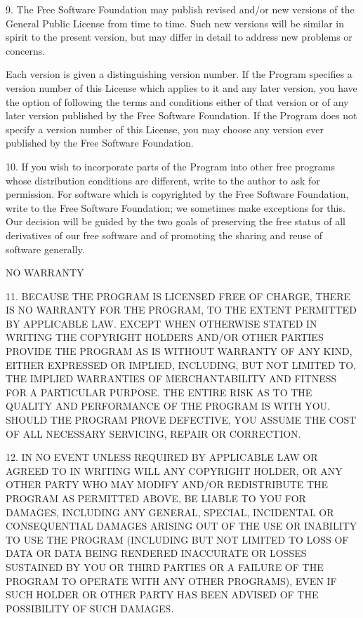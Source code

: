 \documentclass[letterpaper,10pt,english]{sphinxmanual}
\begin{document}
\begin{sphinxVerbatim}[commandchars=\\\{\}]
  9. The Free Software Foundation may publish revised and/or new versions
of the General Public License from time to time.  Such new versions will
be similar in spirit to the present version, but may differ in detail to
address new problems or concerns.

Each version is given a distinguishing version number.  If the Program
specifies a version number of this License which applies to it and \PYGZdq{}any
later version\PYGZdq{}, you have the option of following the terms and conditions
either of that version or of any later version published by the Free
Software Foundation.  If the Program does not specify a version number of
this License, you may choose any version ever published by the Free Software
Foundation.

  10. If you wish to incorporate parts of the Program into other free
programs whose distribution conditions are different, write to the author
to ask for permission.  For software which is copyrighted by the Free
Software Foundation, write to the Free Software Foundation; we sometimes
make exceptions for this.  Our decision will be guided by the two goals
of preserving the free status of all derivatives of our free software and
of promoting the sharing and reuse of software generally.

                            NO WARRANTY

  11. BECAUSE THE PROGRAM IS LICENSED FREE OF CHARGE, THERE IS NO WARRANTY
FOR THE PROGRAM, TO THE EXTENT PERMITTED BY APPLICABLE LAW.  EXCEPT WHEN
OTHERWISE STATED IN WRITING THE COPYRIGHT HOLDERS AND/OR OTHER PARTIES
PROVIDE THE PROGRAM \PYGZdq{}AS IS\PYGZdq{} WITHOUT WARRANTY OF ANY KIND, EITHER EXPRESSED
OR IMPLIED, INCLUDING, BUT NOT LIMITED TO, THE IMPLIED WARRANTIES OF
MERCHANTABILITY AND FITNESS FOR A PARTICULAR PURPOSE.  THE ENTIRE RISK AS
TO THE QUALITY AND PERFORMANCE OF THE PROGRAM IS WITH YOU.  SHOULD THE
PROGRAM PROVE DEFECTIVE, YOU ASSUME THE COST OF ALL NECESSARY SERVICING,
REPAIR OR CORRECTION.

  12. IN NO EVENT UNLESS REQUIRED BY APPLICABLE LAW OR AGREED TO IN WRITING
WILL ANY COPYRIGHT HOLDER, OR ANY OTHER PARTY WHO MAY MODIFY AND/OR
REDISTRIBUTE THE PROGRAM AS PERMITTED ABOVE, BE LIABLE TO YOU FOR DAMAGES,
INCLUDING ANY GENERAL, SPECIAL, INCIDENTAL OR CONSEQUENTIAL DAMAGES ARISING
OUT OF THE USE OR INABILITY TO USE THE PROGRAM (INCLUDING BUT NOT LIMITED
TO LOSS OF DATA OR DATA BEING RENDERED INACCURATE OR LOSSES SUSTAINED BY
YOU OR THIRD PARTIES OR A FAILURE OF THE PROGRAM TO OPERATE WITH ANY OTHER
PROGRAMS), EVEN IF SUCH HOLDER OR OTHER PARTY HAS BEEN ADVISED OF THE
POSSIBILITY OF SUCH DAMAGES.


\end{sphinxVerbatim}
\end{document}
